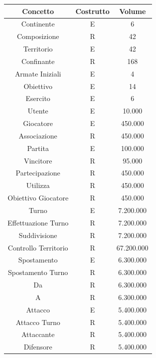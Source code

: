 \documentclass[a4paper,12pt]{report}
\begin{document}
\begin{table}[H]
    \centering
    \begin{tabular}{|c|c|c|}
        \hline
        \rowcolor{lime!50} 
        \textbf{Concetto}& \textbf{Costrutto}& \textbf{Volume}\\ \hline
        Continente & E & 6 \\ \hline 
        Composizione & R & 42 \\ \hline 
        Territorio & E & 42 \\ \hline 
        Confinante & R & 168\\ \hline 
        Armate Iniziali & E & 4 \\ \hline
        Obiettivo & E & 14 \\ \hline 
        Esercito & E & 6 \\ \hline 
        Utente & E & 10.000 \\ \hline
        Giocatore & E & 450.000 \\ \hline 
        Associazione & R & 450.000 \\ \hline 
        Partita & E & 100.000 \\ \hline 
        Vincitore & R & 95.000 \\ \hline 
        Partecipazione & R & 450.000 \\ \hline 
        Utilizza & R & 450.000 \\ \hline 
        Obiettivo Giocatore & R & 450.000 \\ \hline 
        Turno & E & 7.200.000 \\ \hline
        Effettuazione Turno & R & 7.200.000 \\ \hline
        Suddivisione & R & 7.200.000 \\ \hline
        Controllo Territorio & R & 67.200.000\\ \hline
        Spostamento & E & 6.300.000 \\ \hline 
        Spostamento Turno & R & 6.300.000 \\ \hline 
        Da & R & 6.300.000 \\ \hline 
        A & R & 6.300.000 \\ \hline 
        Attacco & E & 5.400.000 \\ \hline 
        Attacco Turno & R & 5.400.000 \\ \hline 
        Attaccante & R & 5.400.000 \\ \hline 
        Difensore & R & 5.400.000 \\ \hline 
    \end{tabular}
\end{table}
\end{document}
